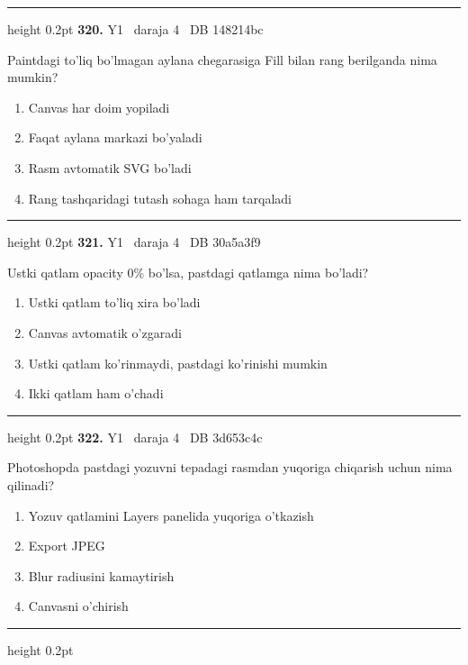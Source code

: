 \documentclass[10pt,a4paper,oneside]{article}
\begin{document}
\vspace{2mm}\hrule height 0.2pt \vspace{4mm}
\hypertarget{q320}{\textbf{\color{ink}320.}}  {\color{muted}\scriptsize Y1 \textbullet\ daraja 4 \textbullet\ DB 148214bc}
\par
Paintdagi to'liq bo'lmagan aylana chegarasiga Fill bilan rang berilganda nima mumkin?
\begin{enumerate}[label=\Alph*),leftmargin=9mm]
\item Canvas har doim yopiladi
\item Faqat aylana markazi bo'yaladi
\item Rasm avtomatik SVG bo'ladi
\item Rang tashqaridagi tutash sohaga ham tarqaladi
\end{enumerate}
\vspace{2mm}\hrule height 0.2pt \vspace{4mm}
\hypertarget{q321}{\textbf{\color{ink}321.}}  {\color{muted}\scriptsize Y1 \textbullet\ daraja 4 \textbullet\ DB 30a5a3f9}
\par
Ustki qatlam opacity 0\% bo'lsa, pastdagi qatlamga nima bo'ladi?
\begin{enumerate}[label=\Alph*),leftmargin=9mm]
\item Ustki qatlam to'liq xira bo'ladi
\item Canvas avtomatik o'zgaradi
\item Ustki qatlam ko'rinmaydi, pastdagi ko'rinishi mumkin
\item Ikki qatlam ham o'chadi
\end{enumerate}
\vspace{2mm}\hrule height 0.2pt \vspace{4mm}
\hypertarget{q322}{\textbf{\color{ink}322.}}  {\color{muted}\scriptsize Y1 \textbullet\ daraja 4 \textbullet\ DB 3d653c4c}
\par
Photoshopda pastdagi yozuvni tepadagi rasmdan yuqoriga chiqarish uchun nima qilinadi?
\begin{enumerate}[label=\Alph*),leftmargin=9mm]
\item Yozuv qatlamini Layers panelida yuqoriga o'tkazish
\item Export JPEG
\item Blur radiusini kamaytirish
\item Canvasni o'chirish
\end{enumerate}
\vspace{2mm}\hrule height 0.2pt \vspace{4mm}
\end{document}
